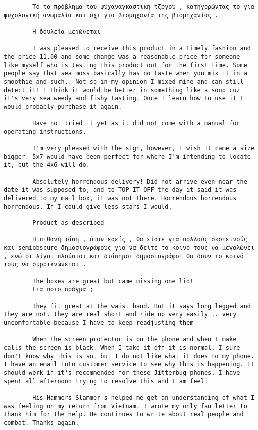 \documentclass[11pt, a4paper]{article}
\begin{document}
\begin{verbatim}
		Το το πρόβλημα του ψυχαναγκαστική τζόγου , κατηγορώντας το για ψυχολογική ανωμαλία και όχι για βιομηχανία της βιομηχανίας .
		
		Η δουλεία μειώνεται
		
		I was pleased to receive this product in a timely fashion and the price 11.00 and some change was a reasonable price for someone like myself who is testing this product out for the first time. Some people say that sea moss basically has no taste when you mix it in a smoothie and such.. Not so in my opinion I mixed mine and can still detect it! I think it would be better in something like a soup cuz it's very sea weedy and fishy tasting. Once I learn how to use it I would probably purchase it again.
		
		Have not tried it yet as it did not come with a manual for operating instructions.
		
		I'm very pleased with the sign, however, I wish it came a size bigger. 5x7 would have been perfect for where I'm intending to locate it, but the 4x6 will do.
		
		Absolutely horrendous delivery! Did not arrive even near the date it was supposed to, and to TOP IT OFF the day it said it was delivered to my mail box, it was not there. Horrendous horrendous horrendous. If I could give less stars I would.
		
		Product as described
		
		Η πιθανή τάση , όταν εσείς , θα είστε για πολλούς σκοτεινούς και semiobscure δημοσιογράφους για να δείτε το κοινό τους να μεγαλώνει , ενώ οι λίγοι πλούσιοι και διάσημοι δημοσιογράφοι θα δουν το κοινό τους να συρρικνώνεται .
		
		The boxes are great but came missing one lid!
		Για ποιο πράγμα ;
		
		They fit great at the waist band. But it says long legged and they are not. they are real short and ride up very easily .. very uncomfortable because I have to keep readjusting them
		
		When the screen protector is on the phone and when I make calls the screen is black. When I take it off it is normal. I sure don't know why this is so, but I do not like what it does to my phone. I have an email into customer service to see why this is happening. It should work if it's recommended for these Jitterbug phones. I have spent all afternoon trying to resolve this and I am feeli
		
		His Hammers Slammer s helped me get an understanding of what I was feeling on my return from Vietnam. I wrote my only fan letter to thank him for the help. He continues to write about real people and combat. Thanks again.
		

\end{verbatim}
\end{document}
